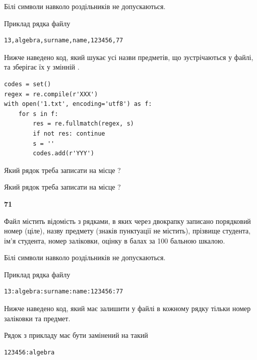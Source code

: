 Білі символи навколо роздільників не допускаються.

Приклад рядка файлу



\begin{verbatim}
13,algebra,surname,name,123456,77
\end{verbatim}


Нижче наведено код, який шукає усі назви предметів, що зустрічаються у файлі, та зберігає їх у змінній .



\begin{verbatim}
codes = set()
regex = re.compile(r'XXX')
with open('1.txt', encoding='utf8') as f:
    for s in f:
        res = re.fullmatch(regex, s)
        if not res: continue
        s = ''
        codes.add(r'YYY')
\end{verbatim}





Який рядок треба записати на місце  ?\par
\vspace{5mm}


Який рядок треба записати на місце  ?\par


\newpage

{\begin {center}\textbf{ 71}\end {center}}\par
Файл  містить відомість з рядками, в яких через двокрапку записано поряд\-ковий номер (ціле), назву предмету (знаків пунктуації не містить), прізвище студента, ім'я студента, номер заліковки, оцінку в балах за 100 бальною шкалою.

Білі символи навколо роздільників не допускаються.

Приклад рядка файлу



\begin{verbatim}
13:algebra:surname:name:123456:77
\end{verbatim}


Нижче наведено код, який має залишити у файлі в кожному рядку тільки номер заліковки та предмет.

Рядок з прикладу має бути замінений на такий



\begin{verbatim}
123456:algebra
\end{verbatim}




